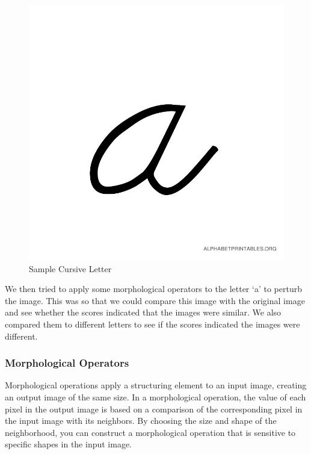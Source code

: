 \documentclass{article}
\begin{document}
\begin{figure}[h!]
\begin{center}
\includegraphics[scale=0.16]{alphabet_cursive_letter_a.jpg}
\caption{Sample Cursive Letter}
\end{center}
\end{figure}

We then tried to apply some morphological operators to the letter `a' to
perturb the image. This was so that we could compare this image with the
original image and see whether the scores indicated that the images were
similar. We also compared them to different letters to see if the scores
indicated the images were different.

\subsubsection{Morphological Operators}

Morphological operations apply a structuring element to an input image,
creating an output image of the same size. In a morphological operation, the
value of each pixel in the output image is based on a comparison of the
corresponding pixel in the input image with its neighbors. By choosing the size
and shape of the neighborhood, you can construct a morphological operation that
is sensitive to specific shapes in the input image.\cite{morph}\\
\end{document}
